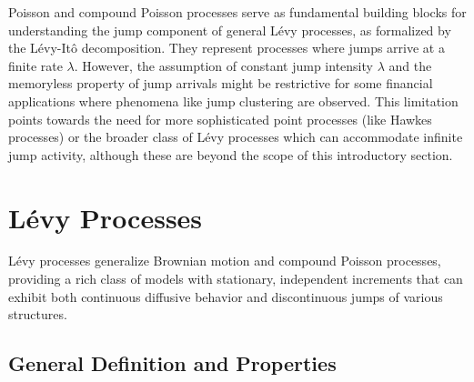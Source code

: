 \documentclass[11pt,twoside,openright]{report}
\begin{document}
Poisson and compound Poisson processes serve as fundamental building blocks for understanding the jump component of general Lévy processes, as formalized by the Lévy-Itô decomposition. They represent processes where jumps arrive at a finite rate $\lambda$. However, the assumption of constant jump intensity $\lambda$ and the memoryless property of jump arrivals might be restrictive for some financial applications where phenomena like jump clustering are observed. This limitation points towards the need for more sophisticated point processes (like Hawkes processes) or the broader class of Lévy processes which can accommodate infinite jump activity, although these are beyond the scope of this introductory section.

\section{Lévy Processes}
\label{sec:levy_general}

Lévy processes generalize Brownian motion and compound Poisson processes, providing a rich class of models with stationary, independent increments that can exhibit both continuous diffusive behavior and discontinuous jumps of various structures.

\subsection{General Definition and Properties}
\label{subsec:levy_def_props}
\end{document}
